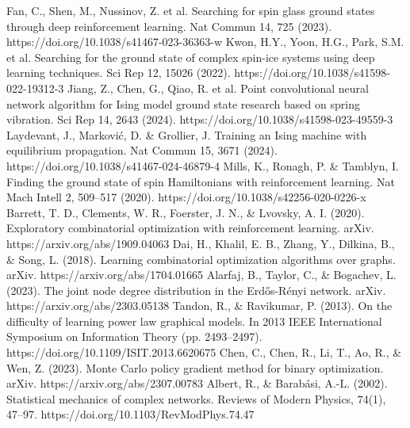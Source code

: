 \documentclass{article}
\begin{document}
\begin{thebibliography}{00}
Fan, C., Shen, M., Nussinov, Z. et al. Searching for spin glass ground states through deep reinforcement learning. Nat Commun 14, 725 (2023). https://doi.org/10.1038/s41467-023-36363-w
Kwon, H.Y., Yoon, H.G., Park, S.M. et al. Searching for the ground state of complex spin-ice systems using deep learning techniques. Sci Rep 12, 15026 (2022). https://doi.org/10.1038/s41598-022-19312-3
Jiang, Z., Chen, G., Qiao, R. et al. Point convolutional neural network algorithm for Ising model ground state research based on spring vibration. Sci Rep 14, 2643 (2024). https://doi.org/10.1038/s41598-023-49559-3
Laydevant, J., Marković, D. \& Grollier, J. Training an Ising machine with equilibrium propagation. Nat Commun 15, 3671 (2024). https://doi.org/10.1038/s41467-024-46879-4
Mills, K., Ronagh, P. \& Tamblyn, I. Finding the ground state of spin Hamiltonians with reinforcement learning. Nat Mach Intell 2, 509–517 (2020). https://doi.org/10.1038/s42256-020-0226-x
Barrett, T. D., Clements, W. R., Foerster, J. N., \& Lvovsky, A. I. (2020). Exploratory combinatorial optimization with reinforcement learning. arXiv. https://arxiv.org/abs/1909.04063
Dai, H., Khalil, E. B., Zhang, Y., Dilkina, B., \& Song, L. (2018). Learning combinatorial optimization algorithms over graphs. arXiv. https://arxiv.org/abs/1704.01665
Alarfaj, B., Taylor, C., \& Bogachev, L. (2023). The joint node degree distribution in the Erdős-Rényi network. arXiv. https://arxiv.org/abs/2303.05138
Tandon, R., \& Ravikumar, P. (2013). On the difficulty of learning power law graphical models. In 2013 IEEE International Symposium on Information Theory (pp. 2493–2497). https://doi.org/10.1109/ISIT.2013.6620675
Chen, C., Chen, R., Li, T., Ao, R., \& Wen, Z. (2023). Monte Carlo policy gradient method for binary optimization. arXiv. https://arxiv.org/abs/2307.00783
Albert, R., \& Barabási, A.-L. (2002). Statistical mechanics of complex networks. Reviews of Modern Physics, 74(1), 47–97. https://doi.org/10.1103/RevModPhys.74.47

\end{thebibliography}
\end{document}

